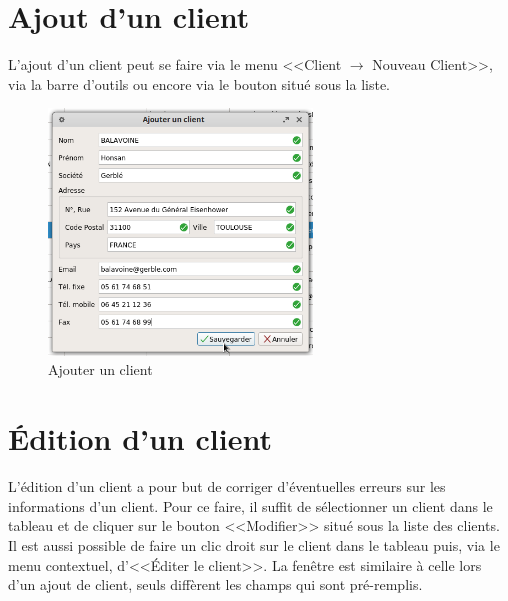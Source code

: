 \section{Ajout d'un client}
L'ajout d’un client peut se faire via le menu <<Client $\rightarrow$ Nouveau Client>>, via la barre d'outils ou encore via le bouton situé sous la
liste. 
\begin{figure}[H]
	\centering
	\includegraphics[width=7cm]{screens/ajouterClient.png}
	\caption{Ajouter un client}
\end{figure}

\section{Édition d'un client}
L’édition d’un client a pour but de corriger d’éventuelles erreurs sur les informations d’un client. Pour ce faire, il suffit de sélectionner
un client dans le tableau et de cliquer sur le bouton <<Modifier>> situé sous la liste des clients. Il est aussi possible de faire un clic droit sur le client dans le tableau puis, via le menu contextuel, d'<<Éditer le client>>.
 La fenêtre est similaire à celle lors d’un ajout de client, seuls diffèrent les champs qui sont pré-remplis. 

